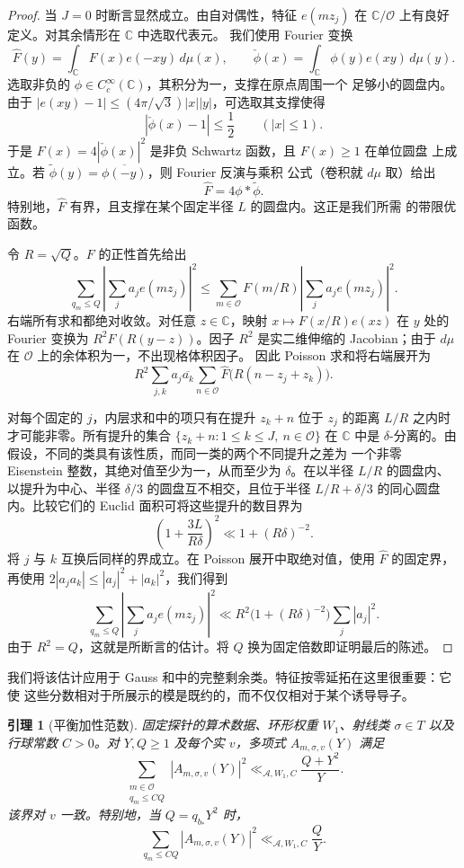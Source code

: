 \documentclass[11pt,a4paper]{article}
\numberwithin{equation}{section}
\numberwithin{figure}{section}
\newtheorem{lemma}[theorem]{引理}
\theoremstyle{definition}
\theoremstyle{remark}
\begin{document}
\begin{proof}
当 $J=0$ 时断言显然成立。由自对偶性，特征 $e(mz_j)$ 在
$\mathbb C/\mathcal O$ 上有良好定义。对其余情形在 $\mathbb C$ 中选取代表元。
我们使用 Fourier 变换
\[
 \widehat F(y)=\int_{\mathbb C}F(x)e(-xy)\,d\mu(x),\qquad
 \check\phi(x)=\int_{\mathbb C}\phi(y)e(xy)\,d\mu(y).
\]
选取非负的 $\phi\in C_c^\infty(\mathbb C)$，其积分为一，支撑在原点周围一个
足够小的圆盘内。由于 $|e(xy)-1|\le (4\pi/\sqrt3)|x||y|$，可选取其支撑使得
\[
 |\check\phi(x)-1|\le\frac12\qquad(|x|\le1).
\]
于是 $F(x)=4|\check\phi(x)|^2$ 是非负 Schwartz 函数，且 $F(x)\ge1$ 在单位圆盘
上成立。若 $\widetilde\phi(y)=\overline{\phi(-y)}$，则 Fourier 反演与乘积
公式（卷积就 $d\mu$ 取）给出
\[
 \widehat F=4\phi*\widetilde\phi.
\]
特别地，$\widehat F$ 有界，且支撑在某个固定半径 $L$ 的圆盘内。这正是我们所需
的带限优函数。

令 $R=\sqrt Q$。$F$ 的正性首先给出
\[
 \sum_{q_m\le Q}\left|\sum_j a_je(mz_j)\right|^2
 \le \sum_{m\in\mathcal O}F(m/R)
                    \left|\sum_j a_je(mz_j)\right|^2.
\]
右端所有求和都绝对收敛。对任意 $z\in\mathbb C$，映射 $x\mapsto F(x/R)e(xz)$
在 $y$ 处的 Fourier 变换为 $R^2\widehat F(R(y-z))$。因子 $R^2$ 是实二维伸缩的
Jacobian；由于 $d\mu$ 在 $\mathcal O$ 上的余体积为一，不出现格体积因子。
因此 Poisson 求和将右端展开为
\[
 R^2\sum_{j,k}a_j\overline{a_k}
       \sum_{n\in\mathcal O}
       \widehat F\bigl(R(n-z_j+z_k)\bigr).
\]

对每个固定的 $j$，内层求和中的项只有在提升 $z_k+n$ 位于 $z_j$ 的距离 $L/R$
之内时才可能非零。所有提升的集合
$\{z_k+n:1\le k\le J,\ n\in\mathcal O\}$ 在 $\mathbb C$ 中是
$\delta$-分离的。由假设，不同的类具有该性质，而同一类的两个不同提升之差为
一个非零 Eisenstein 整数，其绝对值至少为一，从而至少为 $\delta$。在以半径
$L/R$ 的圆盘内、以提升为中心、半径 $\delta/3$ 的圆盘互不相交，且位于半径
$L/R+\delta/3$ 的同心圆盘内。比较它们的 Euclid 面积可将这些提升的数目界为
\[
 \left(1+\frac{3L}{R\delta}\right)^2
 \ll 1+(R\delta)^{-2}.
\]
将 $j$ 与 $k$ 互换后同样的界成立。在 Poisson 展开中取绝对值，使用
$\widehat F$ 的固定界，再使用 $2|a_ja_k|\le |a_j|^2+|a_k|^2$，我们得到
\[
 \sum_{q_m\le Q}\left|\sum_j a_je(mz_j)\right|^2
 \ll R^2\bigl(1+(R\delta)^{-2}\bigr)\sum_j|a_j|^2.
\]
由于 $R^2=Q$，这就是所断言的估计。将 $Q$ 换为固定倍数即证明最后的陈述。
\end{proof}

我们将该估计应用于 Gauss 和中的完整剩余类。特征按零延拓在这里很重要：它使
这些分数相对于所展示的模是既约的，而不仅仅相对于某个诱导导子。

\begin{lemma}[平衡加性范数]
\label{lem:balanced-additive-norm}
固定探针的算术数据、环形权重 $W_1$、射线类 $\sigma\in T$ 以及行球常数
$C>0$。对 $Y,Q\ge1$ 及每个实 $v$，多项式 $A_{m,\sigma,v}(Y)$ 满足
\[
 \sum_{\substack{m\in\mathcal O\\q_m\le CQ}}
       |A_{m,\sigma,v}(Y)|^2
 \ll_{\mathcal A,W_1,C}\frac{Q+Y^2}{Y}.
\]
该界对 $v$ 一致。特别地，当 $Q=q_{b_*}Y^2$ 时，
\[
 \sum_{q_m\le CQ}|A_{m,\sigma,v}(Y)|^2
 \ll_{\mathcal A,W_1,C}\frac QY.
\]
\end{lemma}
\end{document}

